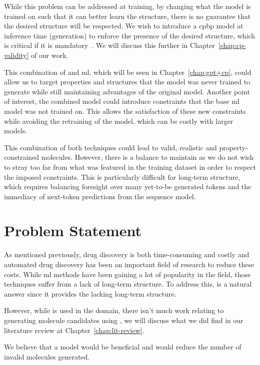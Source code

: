 \documentclass[../Document.tex]{subfiles}
\begin{document}
While this problem can be addressed at training, by changing what the model is trained on such that it can better learn the structure, there is no guarantee that the desired structure will be respected. 
We wish to introduce a \gls{cpbp} model at inference time (generation) to enforce the presence of the desired structure, which is critical if it is mandatory~\cite{deutsch2019general,lee2019gradient}. We will discuss this further in Chapter~\ref{chap:cp-validity} of our work.

This combination of \cp and \gls{ml}, which will be seen in Chapter~\ref{chap:gpt+cp}, could allow us to target properties and structures that the model was never trained to generate while still maintaining advantages of the original model.
Another point of interest, the combined model could introduce constraints that the base \gls{ml} model was not trained on.
This allows the satisfaction of these new constraints while avoiding the retraining of the model, which can be costly with larger models.

This combination of both techniques could lead to valid, realistic and property-constrained molecules. However, there is a balance to maintain as we do not wish to stray too far from what was featured in the training dataset in order to respect the imposed constraints. This is particularly difficult for long-term structure, which requires balancing foresight over many yet-to-be generated tokens and the immediacy of next-token predictions from the sequence model.


\section{Problem Statement}
\label{sec:intro/problem}

As mentioned previously, drug discovery is both time-consuming and costly and automated drug discovery has been an important field of research to reduce these costs.
While \gls{ml} methods have been gaining a lot of popularity in the field, those techniques suffer from a lack of long-term structure.
To address this, \cp is a natural answer since it provides the lacking long-term structure.

However, while \cp is used in the domain, there isn't much work relating to generating molecule candidates using \cp, we will discuss what we did find in our literature review at Chapter~\ref{chap:lit-review}.

We believe that a \cp model would be beneficial and would reduce the number of invalid molecules generated.
\end{document}
